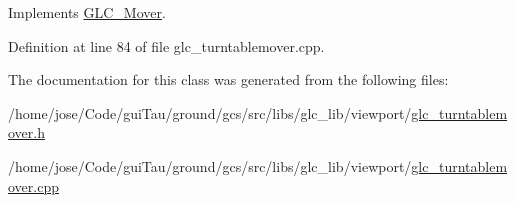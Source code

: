 Implements \hyperlink{class_g_l_c___mover_a50797471a7a71612eef7d80f509f8a74}{G\-L\-C\-\_\-\-Mover}.



Definition at line 84 of file glc\-\_\-turntablemover.\-cpp.



The documentation for this class was generated from the following files\-:\begin{DoxyCompactItemize}
\item 
/home/jose/\-Code/gui\-Tau/ground/gcs/src/libs/glc\-\_\-lib/viewport/\hyperlink{glc__turntablemover_8h}{glc\-\_\-turntablemover.\-h}\item 
/home/jose/\-Code/gui\-Tau/ground/gcs/src/libs/glc\-\_\-lib/viewport/\hyperlink{glc__turntablemover_8cpp}{glc\-\_\-turntablemover.\-cpp}\end{DoxyCompactItemize}
